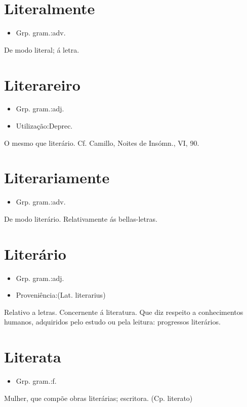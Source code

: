 \section{Literalmente}
\begin{itemize}
\item {Grp. gram.:adv.}
\end{itemize}
De modo literal; á letra.
\section{Literareiro}
\begin{itemize}
\item {Grp. gram.:adj.}
\end{itemize}
\begin{itemize}
\item {Utilização:Deprec.}
\end{itemize}
O mesmo que \textunderscore literário\textunderscore . Cf. Camillo, \textunderscore Noites de Insómn.\textunderscore , VI, 90.
\section{Literariamente}
\begin{itemize}
\item {Grp. gram.:adv.}
\end{itemize}
De modo literário.
Relativamente ás bellas-letras.
\section{Literário}
\begin{itemize}
\item {Grp. gram.:adj.}
\end{itemize}
\begin{itemize}
\item {Proveniência:(Lat. \textunderscore literarius\textunderscore )}
\end{itemize}
Relativo a letras.
Concernente á literatura.
Que diz respeito a conhecimentos humanos, adquiridos pelo estudo ou pela leitura: \textunderscore progressos literários\textunderscore .
\section{Literata}
\begin{itemize}
\item {Grp. gram.:f.}
\end{itemize}
Mulher, que compõe obras literárias; escritora.
(Cp. \textunderscore literato\textunderscore )
